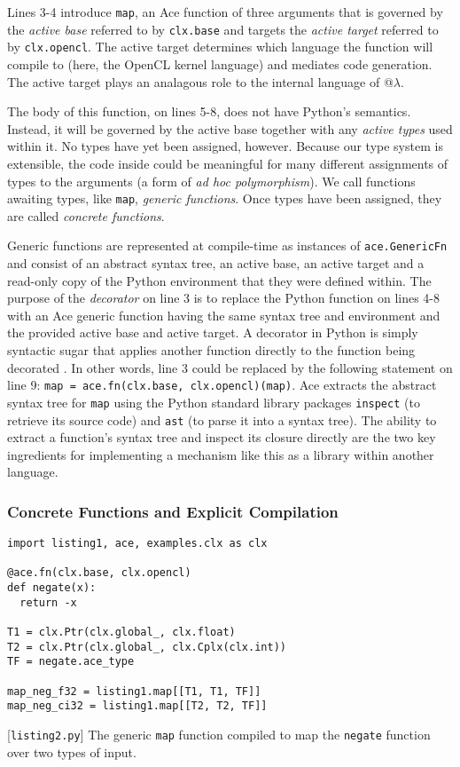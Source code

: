 Lines 3-4 introduce \verb|map|, an Ace function of three arguments that is governed by the \emph{active base} referred to by \verb|clx.base| and targets the \emph{active target} referred to by \verb|clx.opencl|. The active target determines which language the function will compile to (here, the OpenCL kernel language) and mediates code generation. The active target plays an analagous role to the internal language of @$\lambda$.

The body of this function, on lines 5-8, does not have Python's semantics. Instead, it will be governed by the active base together with any \emph{active types} used within it. No  types have yet been assigned, however. Because our type system is extensible, the code inside could be meaningful for many different assignments of types to the arguments (a form of \emph{ad hoc polymorphism}). We call functions awaiting types, like \verb|map|,  \emph{generic functions}. Once types have been assigned, they are called \emph{concrete functions}.

Generic functions are represented at compile-time as instances of \verb|ace.GenericFn| and consist of an abstract syntax tree, an {active base}, an {active target} and a read-only copy of the Python environment that they were defined within. The purpose of the \emph{decorator} on line 3 is to replace the Python function on lines 4-8 with an Ace generic function having the same syntax tree and environment and the provided active base and active target. 
A decorator in Python is simply syntactic sugar that applies another function directly to the function  being decorated \cite{python}. In other words, line 3 could be replaced by the following  statement on line 9: \verb|map = ace.fn(clx.base, clx.opencl)(map)|.
Ace extracts the abstract syntax tree for \verb|map| using the Python standard  library packages  \verb|inspect| (to retrieve its source code) and \verb|ast| (to parse it into a syntax tree). The ability to extract a function's syntax tree and inspect its closure directly are the two key ingredients for implementing a mechanism like this as a library within another language.

\subsubsection{Concrete Functions and Explicit Compilation}
\begin{codelisting}
\begin{lstlisting}
import listing1, ace, examples.clx as clx

@ace.fn(clx.base, clx.opencl)
def negate(x):
  return -x

T1 = clx.Ptr(clx.global_, clx.float)
T2 = clx.Ptr(clx.global_, clx.Cplx(clx.int))
TF = negate.ace_type

map_neg_f32 = listing1.map[[T1, T1, TF]]
map_neg_ci32 = listing1.map[[T2, T2, TF]]
\end{lstlisting}
%
\caption{[\texttt{listing2.py}] The generic \texttt{map} function compiled to map the \texttt{negate} function over two  types of input.}
\label{compscript}
\end{codelisting}

